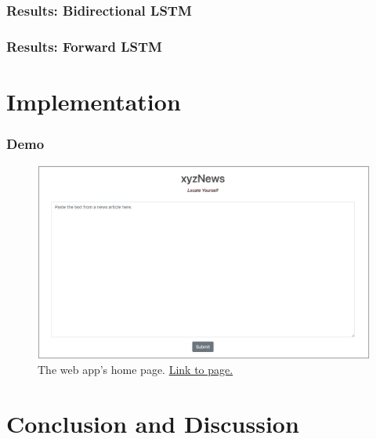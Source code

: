 \documentclass{beamer}
\begin{document}
    \begin{frame}
    	\frametitle{Results: Bidirectional LSTM}
    	
    \end{frame}

    \begin{frame}
    	\frametitle{Results: Forward LSTM}
		
    \end{frame}


\section{Implementation}

     \begin{frame}
    	\frametitle{Demo}
    	\begin{figure}[H]
    		\includegraphics[width=\textwidth]{figures/images/web-form.png}
    		\caption{The web app's home page. \href{http://35.245.203.56:5000}{Link to page.}}
    		\label{fig:form}
    	\end{figure}
    \end{frame}



\section{Conclusion and Discussion}
\end{document}
